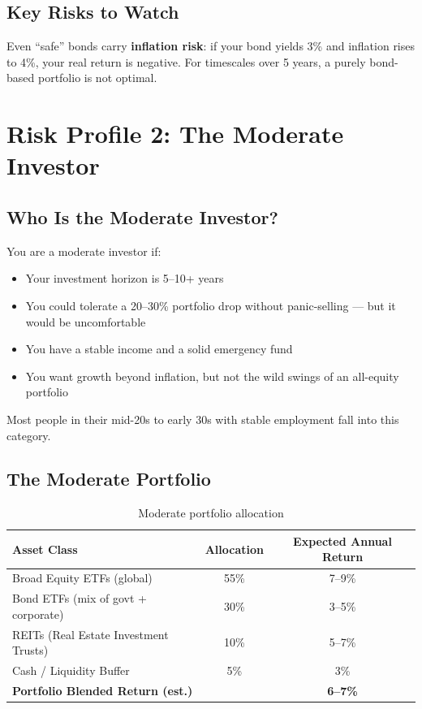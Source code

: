 \documentclass[12pt, a4paper]{book}
\begin{document}
\section{Key Risks to Watch}

\begin{warningbox}
Even ``safe'' bonds carry \textbf{inflation risk}: if your bond yields 3\% and inflation rises to 4\%, your real return is negative. For timescales over 5 years, a purely bond-based portfolio is not optimal.
\end{warningbox}

\chapter{Risk Profile 2: The Moderate Investor}

\section{Who Is the Moderate Investor?}

You are a moderate investor if:
\begin{itemize}[leftmargin=1.5cm]
  \item Your investment horizon is 5--10+ years
  \item You could tolerate a 20--30\% portfolio drop without panic-selling --- but it would be uncomfortable
  \item You have a stable income and a solid emergency fund
  \item You want growth beyond inflation, but not the wild swings of an all-equity portfolio
\end{itemize}

Most people in their mid-20s to early 30s with stable employment fall into this category.

\section{The Moderate Portfolio}

\begin{table}[h!]
\centering
\begin{tabular}{lcc}
\toprule
\textbf{Asset Class} & \textbf{Allocation} & \textbf{Expected Annual Return} \\
\midrule
Broad Equity ETFs (global) & 55\% & 7--9\% \\
Bond ETFs (mix of govt + corporate) & 30\% & 3--5\% \\
REITs (Real Estate Investment Trusts) & 10\% & 5--7\% \\
Cash / Liquidity Buffer & 5\% & 3\% \\
\midrule
\textbf{Portfolio Blended Return (est.)} & & \textbf{6--7\%} \\
\bottomrule
\end{tabular}
\caption{Moderate portfolio allocation}
\end{table}
\end{document}
